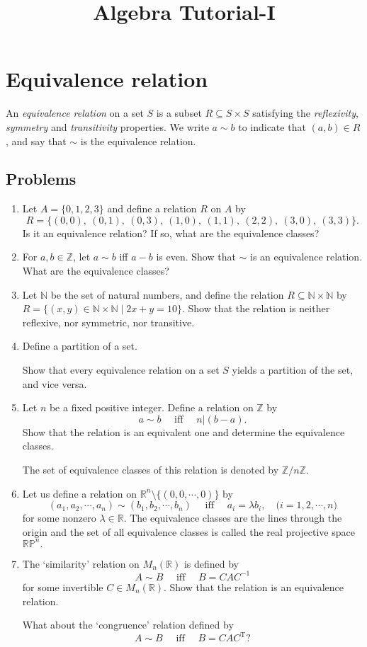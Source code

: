 \documentclass{article}
\title{Algebra Tutorial-I}
\begin{document}
\section*{Equivalence relation}
An \emph{equivalence relation} on a set \( S \) is a subset \( R \subseteq S \times S \) satisfying the \emph{reflexivity}, \emph{symmetry} and \emph{transitivity} properties.
We write \( a \sim b \) to indicate that \( (a, b) \in R \), and say that \( \sim \) is the equivalence relation.
\subsection*{Problems}
\begin{enumerate}
    \item Let \( A = \{0, 1, 2, 3\} \) and define a relation \( R \) on \( A \) by
\[
R = \{(0,0),\ (0,1),\ (0,3),\ (1,0),\ (1,1),\ (2,2),\ (3,0),\ (3,3)\}.
\] Is it an equivalence relation? If so, what are the equivalence classes?
\item For $a,b\in \mathbb Z$, let $a\sim b$ iff $a-b$ is even. Show that $\sim$ is an equivalence relation. {What are the equivalence classes}?
\item Let \( \mathbb{N} \) be the set of natural numbers, and define the relation \( R \subseteq \mathbb{N} \times \mathbb{N} \) by
$R = \{ (x, y) \in \mathbb{N} \times \mathbb{N} \mid 2x + y = 10 \}.$ Show that the relation is neither reflexive, nor symmetric, nor transitive.
\item Define a partition of a set. 

Show that every equivalence relation on a set $S$ yields a partition of the set, and vice versa.
\item Let $n$ be a fixed positive integer. Define a relation on $\mathbb Z$ by \[a\sim b \quad\text{ iff }\quad n\vert(b-a).\] Show that the relation is an equivalent one and determine the equivalence classes.

The set of equivalence classes of this relation is denoted by $\mathbb Z/n\mathbb Z.$

\item Let us define a relation on $\mathbb R^n \setminus\{(0,0,\cdots, 0) \}$ by
\[(a_1,a_2,\cdots,a_n)\sim (b_1,b_2,\cdots,b_n) \quad\text{ iff }\quad a_i=\lambda b_i,\quad \text{($i=1,2,\cdots,n$})\] for some nonzero $\lambda\in \mathbb R.$ The equivalence classes are the lines through the origin and the set of all equivalence classes is called the real projective space $\mathbb{RP}^n.$

\item The `similarity' relation on $M_n(\mathbb R)$ is defined by \[A\sim B \quad\text{ iff }\quad B=CAC^{-1}\] for some invertible $C\in M_n(\mathbb R).$ Show that the relation is an equivalence relation.

What about the `congruence' relation defined by \[A\sim B \quad\text{ iff }\quad B=CAC^{\mathrm T}?\]
\end{enumerate}
\end{document}
